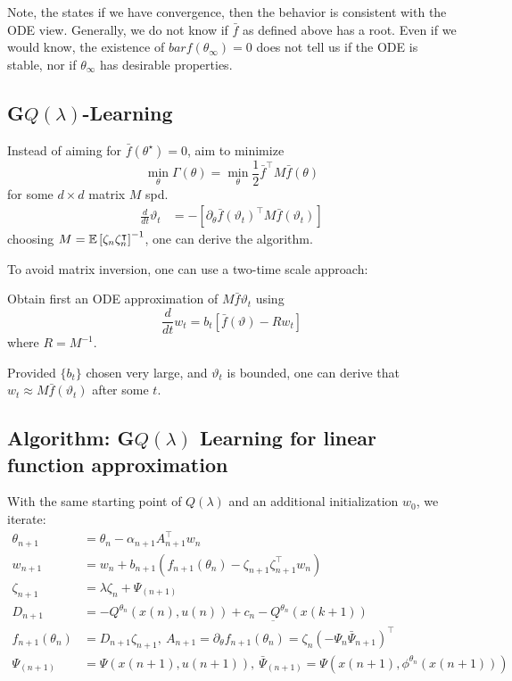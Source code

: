 Note, the states if we have convergence, then the behavior is consistent with the ODE view. 
Generally, we do not know if \(\bar{f}\) as defined above has a root.  Even if we would know,
the existence of \(bar{f}(\theta_\infty)=0\) does not tell us if the ODE  is stable,
nor if \(\theta_\infty\) has desirable properties.

\subsection{G\(Q(\lambda)\)-Learning} 

Instead of aiming for \(\bar{f}(\theta^\star)=0\), aim to 
minimize \[\min_\theta\Gamma(\theta)=\min_\theta\frac{1}{2}\bar{f}^\intercal M \bar{f}(\theta)\]
for some \(d\times d\) matrix \(M\) spd.
\begin{align*}
    \frac{d}{dt}\vartheta_t&=-\left[\partial_\theta \bar{f}(\vartheta_t)^\intercal M \bar{f}(\vartheta_t)\right]
\end{align*}
choosing \(M=\mathbb{E}\left[\zeta_n\zeta_n^\intercal\right]^{-1}\), one can derive the 
 algorithm. 

To avoid matrix inversion, one can use a two-time scale approach: 

Obtain first an ODE approximation of \(M \bar{f}\vartheta_t\) using 
\[\frac{d}{dt}w_t=b_t\left[\bar{f}(\vartheta)-R w_t\right]\] 
where \(R=M^{-1}\). 

Provided \(\{b_t\}\) chosen very large, and \(\vartheta_t\)  is bounded, one can derive that \(w_t\approx M\bar{f}(\vartheta_t)\) after some \(t\). 

\subsection{Algorithm: G\(Q(\lambda)\) Learning for linear function approximation}
With the same starting point of \(Q(\lambda)\) and an additional initialization
\(w_0\), we iterate:
\begin{align*}
    \theta_{n+1}&=\theta_n-\alpha_{n+1}A_{n+1}^\intercal w_n\\
    w_{n+1} &=w_n+b_{n+1}(f_{n+1}(\theta_n)-\zeta_{n+1}\zeta_{n+1}^\intercal w_n)\\
    \zeta_{n+1}&=\lambda \zeta_n+\Psi_{(n+1)}\\
    D_{n+1}&=-Q^{\theta_n}(x(n),u(n))+c_n-\underbar{Q}^{\theta_n}(x(k+1))\\
    f_{n+1}(\theta_n)&=D_{n+1}\zeta_{n+1},\ A_{n+1}=\partial_\theta f_{n+1}(\theta_n)=\zeta_n(-\Psi_{n}\bar{\Psi}_{n+1})^\intercal\\
    \Psi_{(n+1)}&=\Psi(x(n+1),u(n+1)),\ \bar{\Psi}_{(n+1)}=\Psi(x(n+1),\phi^{\theta_n}(x(n+1)))
\end{align*}

